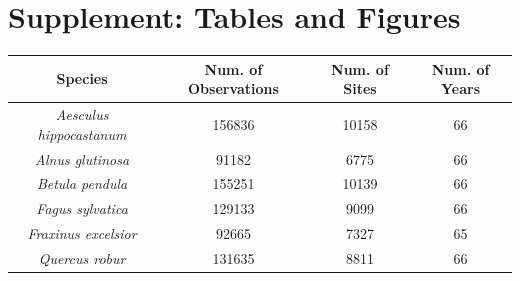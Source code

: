 \documentclass{article}\usepackage[]{graphicx}\usepackage[]{color}
\begin{document}
\section*{Supplement: Tables and Figures}
  
\begin{center}
 \label{tab:spp} 
\begin{tabular}{c c c c}
\hline
\textbf{Species} & \textbf{Num. of Observations} & \textbf{Num. of Sites} & \textbf{Num. of Years} \\
\hline
\textit{Aesculus hippocastanum} & 156836 & 10158 & 66  \\
\hline
\textit{Alnus glutinosa} & 91182 & 6775 & 66 \\
\hline
\textit{Betula pendula} & 155251 & 10139 & 66 \\
\hline
\textit{Fagus sylvatica} & 129133 & 9099 & 66 \\
\hline
\textit{Fraxinus excelsior} & 92665 & 7327 & 65 \\
\hline
\textit{Quercus robur} & 131635  & 8811 & 66 \\
\end{tabular}
\end{center}
\end{document}
